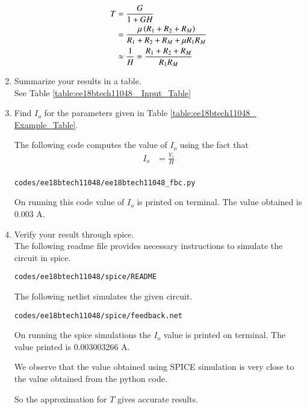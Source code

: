 \begin{enumerate}[label=\arabic*.,ref=\theenumi]
\solution
\begin{align}
T &= \frac{G}{1+GH} \label{eq:ee18btech11048_T}
\\
&= \frac{\mu \left(R_1+R_2+R_M\right)}{R_1+R_2+R_M+ \mu R_1R_M}
\\
 &\approx \frac{1}{H}  = \frac{R_1+R_2+R_M}{R_1R_M} 
\end{align}

\item Summarize your results in a table.
\\
\solution See Table \ref{table:ee18btech11048_ Input_Table}


\begin{table}[!ht]
\centering

\caption{}
\label{table:ee18btech11048_ Input_Table}
\end{table}


\item Find $I_o$ for the parameters given in  Table  \ref{table:ee18btech11048_ Example_Table}.\\
\begin{table}[!ht]
\centering

\caption{}
\label{table:ee18btech11048_ Example_Table}
\end{table}
\solution  The following code computes the value of $I_o$ using the fact that
\begin{align}
I_o &= \frac{V_s}{H}\\
\end{align}
\begin{lstlisting}
codes/ee18btech11048/ee18btech11048_fbc.py
\end{lstlisting}
On running this code value of $I_o$ is printed on terminal. The value obtained is 0.003 A.
\item Verify your result through spice.
\\
\solution The following readme file provides necessary instructions to simulate the circuit in spice.
\begin{lstlisting}
codes/ee18btech11048/spice/README
\end{lstlisting}

The following netlist simulates the given circuit.
\begin{lstlisting}
codes/ee18btech11048/spice/feedback.net
\end{lstlisting}
On running the spice simulations the $I_o$ value is printed on terminal.
The value printed is 0.003003266 A.

We observe that the value obtained using SPICE simulation is very close to the value obtained from the python code.

So the approximation for $T$ gives accurate results.
\end{enumerate}
